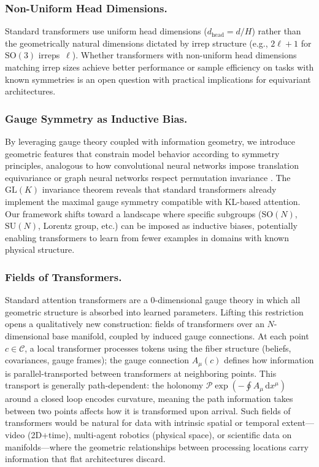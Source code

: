 \documentclass[twoside,11pt]{article}
\begin{document}
\subsubsection{Non-Uniform Head Dimensions.}

Standard transformers use uniform head dimensions ($d_{\mathrm{head}} = d/H$) rather than the geometrically natural dimensions dictated by irrep structure (e.g., $2\ell + 1$ for $\mathrm{SO}(3)$ irreps~$\ell$). Whether transformers with non-uniform head dimensions matching irrep sizes achieve better performance or sample efficiency on tasks with known symmetries is an open question with practical implications for equivariant architectures.

\subsubsection{Gauge Symmetry as Inductive Bias.}

By leveraging gauge theory coupled with information geometry, we introduce geometric features that constrain model behavior according to symmetry principles, analogous to how convolutional neural networks impose translation equivariance or graph neural networks respect permutation invariance \citep{finzi2020generalizing,weiler20183d,kondor2018generalization}. The $\mathrm{GL}(K)$ invariance theorem reveals that standard transformers already implement the maximal gauge symmetry compatible with KL-based attention. Our framework shifts toward a landscape where specific subgroups ($\mathrm{SO}(N)$, $\mathrm{SU}(N)$, Lorentz group, etc.) can be imposed as inductive biases, potentially enabling transformers to learn from fewer examples in domains with known physical structure.

\subsubsection{Fields of Transformers.}

Standard attention transformers are a 0-dimensional gauge theory in which all geometric structure is absorbed into learned parameters. Lifting this restriction opens a qualitatively new construction: fields of transformers over an $N$-dimensional base manifold, coupled by induced gauge connections. At each point $c \in \mathcal{C}$, a local transformer processes tokens using the fiber structure (beliefs, covariances, gauge frames); the gauge connection $A_\mu(c)$ defines how information is parallel-transported between transformers at neighboring points. This transport is generally path-dependent: the holonomy $\mathcal{P}\exp\!\left(-\oint A_\mu \, \mathrm{d}x^\mu\right)$ around a closed loop encodes curvature, meaning the path information takes between two points affects how it is transformed upon arrival. Such fields of transformers would be natural for data with intrinsic spatial or temporal extent---video (2D+time), multi-agent robotics (physical space), or scientific data on manifolds---where the geometric relationships between processing locations carry information that flat architectures discard.
\end{document}
